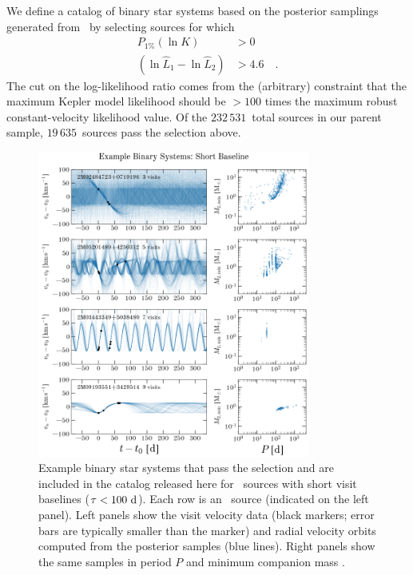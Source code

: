 \documentclass[modern]{aastex63}
\newcommand{\nsources}{\ensuremath{232\,531}}
\newcommand{\nbinary}{\ensuremath{19\,635}}
\begin{document}
We define a catalog of binary star systems based on the posterior samplings
generated from \thejoker\ by selecting sources for which
\begin{align}
    P_{1\%}(\ln K) &> 0\\
    (\ln \hat{L}_1 - \ln \hat{L}_2) &> 4.6 \quad . \label{eq:binary-cuts}
\end{align}
The cut on the log-likelihood ratio comes from the (arbitrary) constraint that
the maximum Kepler model likelihood should be $>100$ times the maximum robust
constant-velocity likelihood value.
Of the \nsources\ total sources in our parent sample, \nbinary\ sources pass the
selection above.

\begin{figure}[!t]
    \begin{center}
    \includegraphics[width=0.8\textwidth]{example-binaries-short-placeholder.png}
    \end{center}
    \caption{%
    Example binary star systems that pass the selection and are included in the
    catalog released here for \apogee\ sources with short visit baselines
    ($\tau < 100~\mathrm{d}$).
    Each row is an \apogee\ source (indicated on the left panel).
    Left panels show the visit velocity data (black markers; error bars are
    typically smaller than the marker) and radial velocity orbits computed from
    the posterior samples (blue lines).
    Right panels show the same samples in period $P$ and minimum companion mass
    \mtwomin.
    \label{fig:binary-examples-short}
    }
\end{figure}
\end{document}
